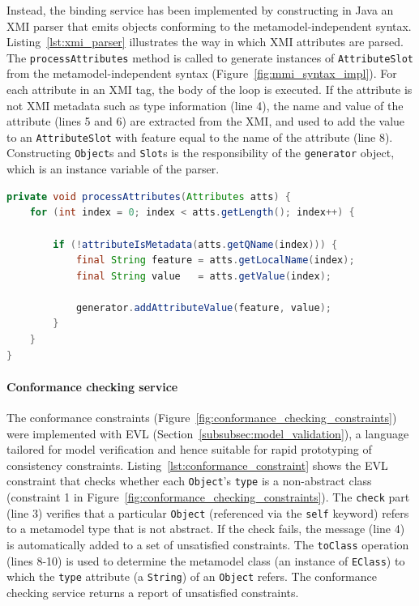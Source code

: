 Instead, the binding service has been implemented by constructing in Java an XMI parser that emits objects conforming to the metamodel-independent syntax. Listing~\ref{lst:xmi_parser} illustrates the way in which XMI attributes are parsed. The \texttt{pr\-oc\-e\-ssAtt\-rib\-ut\-es} method is called to generate instances of \texttt{At\-tr\-ibu\-teSl\-ot} from the metamodel-independent syntax (Figure~\ref{fig:mmi_syntax_impl}). For each attribute in an XMI tag, the body of the loop is executed. If the attribute is not XMI metadata such as type information (line 4), the name and value of the attribute (lines 5 and 6) are extracted from the XMI, and used to add the value to an \texttt{At\-tr\-ibu\-teSl\-ot} with feature equal to the name of the attribute (line 8). Constructing \texttt{O\-bj\-e\-ct}s and \texttt{Sl\-ot}s is the responsibility of the \texttt{ge\-ne\-ra\-tor} object, which is an instance variable of the parser.


\begin{lstlisting}[caption=Parsing XMI attributes (in Java), label=lst:xmi_parser, language=Java]
private void processAttributes(Attributes atts) {
	for (int index = 0; index < atts.getLength(); index++) {
		
		if (!attributeIsMetadata(atts.getQName(index))) {
			final String feature = atts.getLocalName(index);
			final String value   = atts.getValue(index);
			
			generator.addAttributeValue(feature, value);
		}
	}
}
\end{lstlisting}

\paragraph{Conformance checking service} The conformance constraints (Figure~\ref{fig:conformance_checking_constraints}) were implemented with EVL (Section~\ref{subsubsec:model_validation}), a language tailored for model verification and hence suitable for rapid prototyping of consistency constraints. Listing~\ref{lst:conformance_constraint} shows the EVL constraint that checks whether each \texttt{Ob\-je\-ct}'s \texttt{ty\-pe} is a non-abstract class (constraint 1 in Figure~\ref{fig:conformance_checking_constraints}). The \texttt{ch\-e\-ck} part (line 3) verifies that a particular \texttt{Ob\-je\-ct} (referenced via the \texttt{se\-lf} keyword) refers to a metamodel type that is not abstract. If the check fails, the message (line 4) is automatically added to a set of unsatisfied constraints. The \texttt{toCl\-a\-ss} operation (lines 8-10) is used to determine the metamodel class (an instance of \texttt{EClass}) to which the \texttt{type} attribute (a \texttt{St\-ri\-ng}) of an \texttt{Ob\-je\-ct} refers. The conformance checking service returns a report of unsatisfied constraints.

